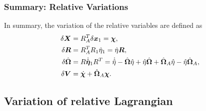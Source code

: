 \subsubsection{Summary: Relative Variations}
In summary, the variation of the relative variables are defined as
\begin{align*}
    \delta \bm{X} &= R_A^T \delta \bm{x}_1 = \bm{\chi} , \\
    \delta \bm{R} &= R_A^T R_1 \hat{\eta}_1 = \hat{\eta} \bm{R} ,\\
    \delta \hat{\bm{\Omega}} &= R \dot{\hat{\bm{\eta}}}_1 R^T = \dot{\hat{\eta}} - \hat{\bm{\Omega}} \hat{\eta} + \hat{\eta} \hat{\bm{\Omega}} +  \hat{\bm{\Omega}}_A \hat{\eta} - \hat{\eta} \hat{\bm{\Omega}}_A , \\
    \delta \bm{V} &= \dot{\bm{\chi}} + \hat{\bm{\Omega}}_A \bm{\chi} .
\end{align*}
\subsection{Variation of relative Lagrangian}\label{ssec:var_rel_lagrangian}

